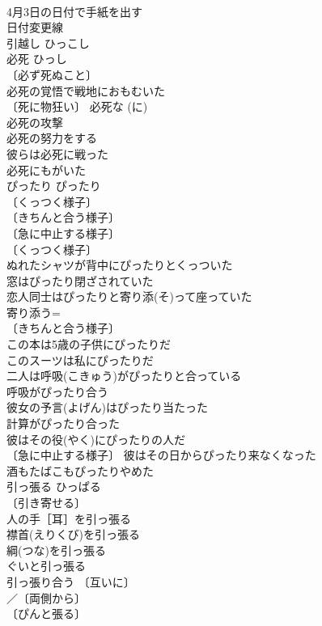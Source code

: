 \documentclass[8pt]{extreport}
\begin{document}
\begin{CJK}{UTF8}{min}
\\	4月3日の日付で手紙を出す 
\\	日付変更線 
\\	引越し	ひっこし	
\\	必死	ひっし	
\\	〔必ず死ぬこと〕
\\	必死の覚悟で戦地におもむいた 
\\	〔死に物狂い〕 必死な (に) 
\\	必死の攻撃 
\\	必死の努力をする 
\\	彼らは必死に戦った 
\\	必死にもがいた 
\\	ぴったり	ぴったり	
\\	〔くっつく様子〕
\\	〔きちんと合う様子〕
\\	〔急に中止する様子〕 
\\	〔くっつく様子〕
\\	ぬれたシャツが背中にぴったりとくっついた 
\\	窓はぴったり閉ざされていた 
\\	恋人同士はぴったりと寄り添(そ)って座っていた 
\\	寄り添う=
\\	〔きちんと合う様子〕
\\	この本は5歳の子供にぴったりだ 
\\	このスーツは私にぴったりだ 
\\	二人は呼吸(こきゅう)がぴったりと合っている 
\\	呼吸がぴったり合う 
\\	彼女の予言(よげん)はぴったり当たった 
\\	計算がぴったり合った 
\\	彼はその役(やく)にぴったりの人だ 
\\	〔急に中止する様子〕 彼はその日からぴったり来なくなった 
\\	酒もたばこもぴったりやめた 
\\	引っ張る	ひっぱる	
\\	〔引き寄せる〕
\\	人の手［耳］を引っ張る 
\\	襟首(えりくび)を引っ張る 
\\	綱(つな)を引っ張る 
\\	ぐいと引っ張る 
\\	引っ張り合う 〔互いに〕
\\	／〔両側から〕
\\	〔ぴんと張る〕

\end{CJK}
\end{document}
